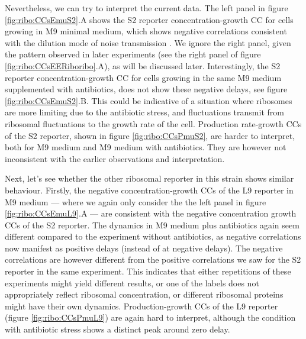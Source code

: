 Nevertheless, we can try to interpret the current data.
%
The left panel in figure \ref{fig:ribo:CCsEmuS2}.A shows the S2 reporter concentration-growth CC for cells growing in M9 minimal medium, 
which shows negative correlations consistent with the dilution mode of noise transmission \cite{Kiviet2014}.
%
We ignore the right panel, given the pattern observed in later experiments (see the right panel of figure \ref{fig:ribo:CCsEERiboribo}.A), as will be discussed later.
%
Interestingly, 
the S2 reporter concentration-growth CC for cells growing in the same M9 medium supplemented with antibiotics, does not show these negative delays, see figure \ref{fig:ribo:CCsEmuS2}.B. 
This could be indicative of a situation where ribosomes are more limiting due to the antibiotic stress, and fluctuations transmit from ribosomal fluctuations to the growth rate of the cell.
%
Production rate-growth CCs of the S2 reporter, shown in figure \ref{fig:ribo:CCsPmuS2}, are harder to interpret, both for M9 medium and M9 medium with antibiotics.
They are however not inconsistent with the earlier observations and interpretation.

Next, let's see whether the other ribosomal reporter in this strain shows similar behaviour.
Firstly, the negative concentration-growth CCs of the L9 reporter in M9 medium --- where we again only consider the the left panel in figure \ref{fig:ribo:CCsEmuL9}.A --- are consistent with the negative concentration growth CCs of the S2 reporter.  
The dynamics in M9 medium plus antibiotics again seem different compared to the experiment without antibiotics, as negative correlations now manifest as positive delays (instead of at negative delays).
The negative correlations are however different from the positive correlations we saw for the S2 reporter in the same experiment.
%
This indicates that either repetitions of these experiments might yield different results, or one of the labels does not appropriately reflect ribosomal concentration, or different ribosomal proteins might have their own dynamics.
%
Production-growth CCs of the L9 reporter (figure \ref{fig:ribo:CCsPmuL9}) are again hard to interpret, although the condition with antibiotic stress shows a distinct peak around zero delay.

